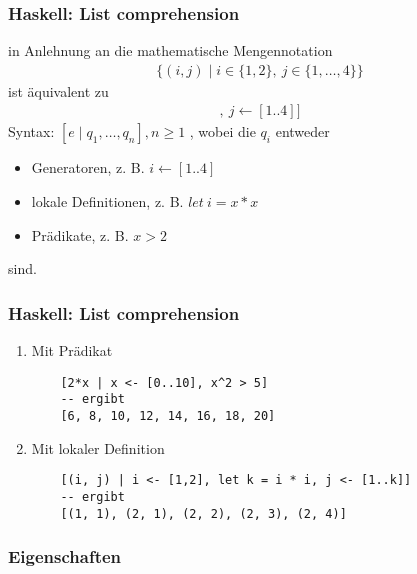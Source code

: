 \documentclass{beamer}
\begin{document}
\begin{frame}[fragile]
\frametitle{Haskell: List comprehension}
in Anlehnung an die mathematische Mengennotation
\begin{gather*}
    \{(i,j) \mid i \in \{1, 2\},\: j \in \{1, \dots, 4\}\}
\end{gather*}
ist äquivalent zu
\begin{gather*}
    [(i, j) \mid i \leftarrow [1,2],\: j \leftarrow [1..4]]
\end{gather*}
Syntax: $[e \mid q_1, \dots, q_n], n \geq 1$ , wobei die $q_i$ entweder
\begin{itemize}
    \item Generatoren, z. B. $i \leftarrow \left[1..4\right]$
    \item lokale Definitionen, z. B. $let\:i = x * x$
    \item Prädikate, z. B. $x > 2$
\end{itemize}
sind.
\end{frame}

\begin{frame}[t, fragile]
\frametitle{Haskell: List comprehension}
\begin{examples}
\begin{enumerate}
    \item Mit Prädikat
    \begin{lstlisting}
    [2*x | x <- [0..10], x^2 > 5]
    -- ergibt
    [6, 8, 10, 12, 14, 16, 18, 20]
    \end{lstlisting}
    \item Mit lokaler Definition
    \begin{lstlisting}
    [(i, j) | i <- [1,2], let k = i * i, j <- [1..k]]
    -- ergibt
    [(1, 1), (2, 1), (2, 2), (2, 3), (2, 4)]
\end{lstlisting}
\end{enumerate}
\end{examples}
\end{frame}

\subsubsection{Eigenschaften}
\end{document}
